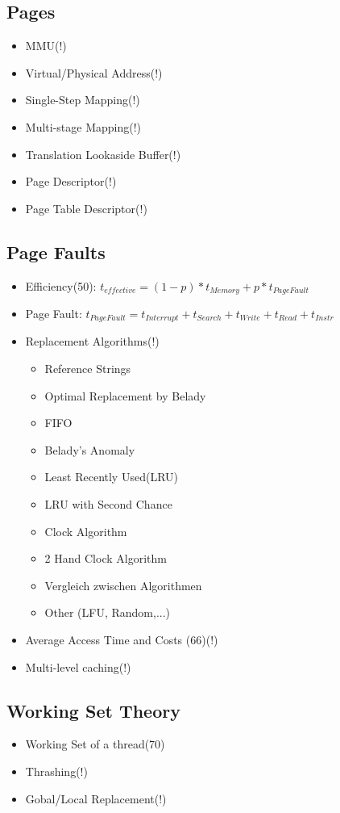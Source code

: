 \documentclass[10pt,a4paper]{article}
\begin{document}
		\subsection{Pages}
			\begin{itemize}
				\item MMU(!)
				\item Virtual/Physical Address(!)
				\item Single-Step Mapping(!)
				\item Multi-stage Mapping(!)
				\item Translation Lookaside Buffer(!)
				\item Page Descriptor(!)
				\item Page Table Descriptor(!)
			\end{itemize}
		\subsection{Page Faults}
			\begin{itemize}
				\item Efficiency(50):  $t_{effective}=(1-p)*t_{Memory}+p*t_{PageFault}$
				\item Page Fault: $t_{PageFault}= t_{Interrupt}+t_{Search}+t_{Write}+t_{Read}+t_{Instr}$
				\item Replacement Algorithms(!)
				\begin{itemize}
					\item Reference Strings
					\item Optimal Replacement by Belady
					\item FIFO
					\item Belady's Anomaly
					\item Least Recently Used(LRU)
					\item LRU with Second Chance
					\item Clock Algorithm
					\item 2 Hand Clock Algorithm
					\item Vergleich zwischen Algorithmen
					\item Other (LFU, Random,...)
				\end{itemize}
				\item Average Access Time and Costs (66)(!)
				\item Multi-level caching(!)
			\end{itemize}
		\subsection{Working Set Theory}
			\begin{itemize}
				\item Working Set of a thread(70)
				\item Thrashing(!)
				\item Gobal/Local Replacement(!)
			\end{itemize}
\end{document}
